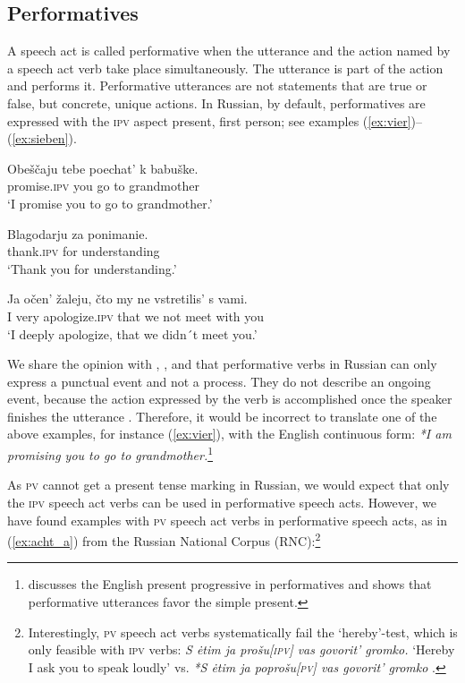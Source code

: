\documentclass[output=paper,
colorlinks,
citecolor=brown,
newtxmath,
hidelinks
]{langscibook}
\begin{document}
\subsection{Performatives}\label{sub:eins:3}

A speech act is called performative when the utterance and the action named by a speech act verb take place simultaneously. The utterance is part of the action \citep{Austin1962} and performs it. Performative utterances are not statements that are true or false, but concrete, unique actions. In Russian, by default, performatives are expressed with the \textsc{ipv} aspect present, first person; see examples (\ref{ex:vier})--(\ref{ex:sieben}).

\ea\label{ex:vier}
\gll Obeščaju	tebe	poechat’	k	babuške.\\
      promise\textsc{.ipv} 	you 	go 		to 	grandmother\\
\glt ‘I promise you to go to grandmother.’
\z

\ea\label{ex:sechs}
\gll Blagodarju 		za ponimanie.\\
 	thank\textsc{.ipv} 	for			understanding\\
\glt ‘Thank you for understanding.’
\z

\ea\label{ex:sieben}
\gll Ja očen’ žaleju, čto my ne vstretilis’ s vami.\\
        I   very	apologize\textsc{.ipv}	that	we	not	meet	with	you\\
\glt ‘I deeply apologize, that we didn´t meet you.’
\z

\noindent We share the opinion with \citet{Apresjan1988}, \citet{Paduceva1994}, and \citet{Petruchina2000} that performative verbs in Russian can only express a punctual event and not a process. They do not describe an ongoing event, because the action expressed by the verb is accomplished once the speaker finishes the utterance \citep{Petruchina2000}. Therefore, it would be incorrect to translate one of the above examples, for instance (\ref{ex:vier}), with the English continuous form: \textit{*I am promising you to go to grandmother.}\footnote{\citet{Harnish2007} discusses the English present progressive in performatives and shows that performative utterances favor the simple present.}

As \textsc{pv} cannot get a present tense marking in Russian, we would expect that only the \textsc{ipv} speech act verbs can be used in performative speech acts. However, we have found examples with \textsc{pv} speech act verbs in performative speech acts, as in (\ref{ex:acht_a}) from the Russian National Corpus (RNC):\footnote{Interestingly, \textsc{pv} speech act verbs systematically fail the ‘hereby’-test, which is only feasible with \textsc{ipv} verbs: \textit{S ėtim ja prošu[\textsc{ipv}] vas govorit’ gromko.} ‘Hereby I ask you to speak loudly’ vs. \textit{*S ėtim ja poprošu[\textsc{pv}] vas govorit’ gromko} \citep{Eckardt2012}.}
\end{document}
